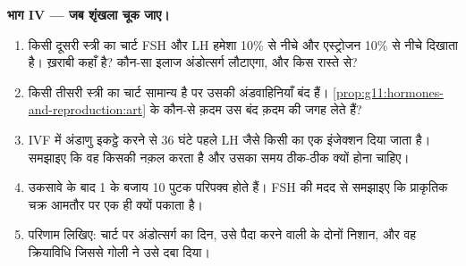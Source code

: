 \begin{problem}
\medskip
\noindent\textbf{भाग IV --- जब शृंखला चूक जाए।}
\begin{enumerate}[resume]
  \item किसी दूसरी स्त्री का चार्ट FSH और LH हमेशा 10\% से नीचे और
        एस्ट्रोजन 10\% से नीचे दिखाता है। ख़राबी कहाँ है? कौन-सा इलाज
        अंडोत्सर्ग लौटाएगा, और किस रास्ते से?
  \item किसी तीसरी स्त्री का चार्ट सामान्य है पर उसकी अंडवाहिनियाँ बंद
        हैं। \cref{prop:g11:hormones-and-reproduction:art} के कौन-से क़दम
        उस बंद क़दम की जगह लेते हैं?
  \item IVF में अंडाणु इकट्ठे करने से 36 घंटे पहले LH जैसे किसी  का
        एक इंजेक्शन दिया जाता है। समझाइए कि वह किसकी नक़ल करता है और उसका
        समय ठीक-ठीक क्यों होना चाहिए।
  \item उकसावे के बाद 1 के बजाय 10 पुटक परिपक्व होते हैं। FSH की मदद से
        समझाइए कि प्राकृतिक चक्र आमतौर पर एक ही क्यों पकाता है।
  \item परिणाम लिखिए: चार्ट पर अंडोत्सर्ग का दिन, उसे पैदा करने वाली
         के दोनों निशान, और वह क्रियाविधि जिससे गोली ने उसे दबा
        दिया।
\end{enumerate}
\end{problem}
